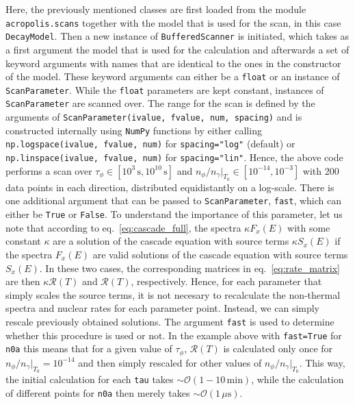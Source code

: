 \documentclass[11pt,a4paper]{article}
\begin{document}
Here, the previously mentioned classes are first loaded from the module \texttt{acropolis.scans} together with the model that is used for the scan, in this case \texttt{DecayModel}. Then a new instance of \texttt{BufferedScanner} is initiated, which takes as a first argument the model that is used for the calculation and afterwards a set of keyword arguments with names that are identical to the ones in the constructor of the model. These keyword arguments can either be a \texttt{float} or an instance of \texttt{ScanParameter}. While the \texttt{float} parameters are kept constant, instances of \texttt{ScanParameter} are scanned over. The range for the scan is defined by the arguments of \texttt{ScanParameter(ivalue, fvalue, num, spacing)} and is constructed internally using \texttt{NumPy} functions by either calling \texttt{np.logspace(ivalue, fvalue, num)} for \texttt{spacing="log"} (default) or \texttt{np.linspace(ivalue, fvalue, num)} for \texttt{spacing="lin"}. Hence, the above code performs a scan over $\tau_\phi \in [10^3\,\mathrm{s}, 10^{10}\,\mathrm{s}]$ and $n_\phi/n_\gamma|_{T_0} \in [10^{-14}, 10^{-3}]$ with 200 data points in each direction, distributed equidistantly on a log-scale. There is one additional argument that can be passed to \texttt{ScanParameter},  \texttt{fast}, which can either be \texttt{True} or \texttt{False}. To understand the importance of this parameter, let us note that according to eq.~\eqref{eq:cascade_full}, the spectra $\kappa F_x(E)$ with some constant $\kappa$ are a solution of the cascade equation with source terms $\kappa S_x(E)$ if the spectra $F_x(E)$ are valid solutions of the cascade equation with source terms $S_x(E)$. In these two cases, the corresponding matrices in eq.~\eqref{eq:rate_matrix} are then $\kappa \mathcal{R}(T)$ and $\mathcal{R}(T)$, respectively. Hence, for each parameter that simply scales the source terms, it is not necesary to recalculate the non-thermal spectra and nuclear rates for each parameter point. Instead, we can simply rescale previously obtained solutions.
The argument \texttt{fast} is used to determine whether this procedure is used or not. In the example above with \texttt{fast=True} for \texttt{n0a} this means that for a given value of $\tau_\phi$, $\mathcal{R}(T)$ is calculated only once for $n_\phi/n_\gamma|_{T_0} = 10^{-14}$ and then simply rescaled for other values of $n_\phi/n_\gamma|_{T_0}$. This way, the initial calculation for each \texttt{tau} takes $\sim \mathcal{O}(1-10\,\mathrm{min})$, while the calculation of different points for \texttt{n0a} then merely takes $\sim \mathcal{O}(1\,\mu\mathrm{s})$.
\end{document}
